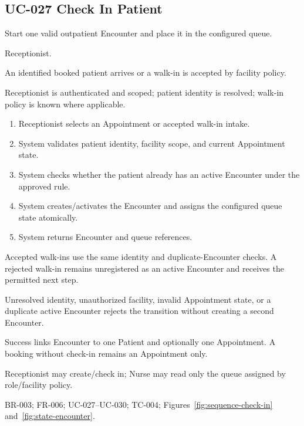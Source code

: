 \subsection{UC-027 Check In Patient}
\begin{description}[leftmargin=2.6cm,style=nextline]
\item[Goal] Start one valid outpatient Encounter and place it in the configured queue.
\item[Primary actor] Receptionist.
\item[Trigger] An identified booked patient arrives or a walk-in is accepted by facility policy.
\item[Preconditions] Receptionist is authenticated and scoped; patient identity is resolved; walk-in policy is known where applicable.
\item[Main success flow]
\begin{enumerate}[leftmargin=1.4em]
  \item Receptionist selects an Appointment or accepted walk-in intake.
  \item System validates patient identity, facility scope, and current Appointment state.
  \item System checks whether the patient already has an active Encounter under the approved rule.
  \item System creates/activates the Encounter and assigns the configured queue state atomically.
  \item System returns Encounter and queue references.
\end{enumerate}
\item[Alternative flows] Accepted walk-ins use the same identity and duplicate-Encounter checks. A rejected walk-in remains unregistered as an active Encounter and receives the permitted next step.
\item[Exception flows] Unresolved identity, unauthorized facility, invalid Appointment state, or a duplicate active Encounter rejects the transition without creating a second Encounter.
\item[Postconditions and data] Success links Encounter to one Patient and optionally one Appointment. A booking without check-in remains an Appointment only.
\item[Authorization] Receptionist may create/check in; Nurse may read only the queue assigned by role/facility policy.
\item[Trace] BR-003; FR-006; UC-027--UC-030; TC-004; Figures~\ref{fig:sequence-check-in} and~\ref{fig:state-encounter}.
\end{description}

